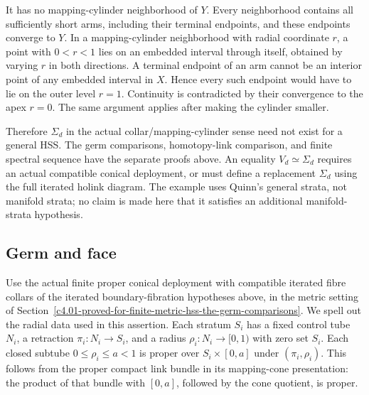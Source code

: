 \documentclass[11pt,a4paper]{article}
\theoremstyle{definition}
\begin{document}
It has no mapping-cylinder neighborhood of \(Y\). Every neighborhood contains all sufficiently short arms, including their terminal endpoints, and these endpoints converge to \(Y\). In a mapping-cylinder neighborhood with radial coordinate \(r\), a point with \(0<r<1\) lies on an embedded interval through itself, obtained by varying \(r\) in both directions. A terminal endpoint of an arm cannot be an interior point of any embedded interval in \(X\). Hence every such endpoint would have to lie on the outer level \(r=1\). Continuity is contradicted by their convergence to the apex \(r=0\). The same argument applies after making the cylinder smaller.

Therefore \(\Sigma_d\) in the actual collar/mapping-cylinder sense need not exist for a general HSS. The germ comparisons, homotopy-link comparison, and finite spectral sequence have the separate proofs above. An equality \(V_d\simeq\Sigma_d\) requires an actual compatible conical deployment, or must define a replacement \(\Sigma_d\) using the full iterated holink diagram. The example uses Quinn's general strata, not manifold strata; no claim is made here that it satisfies an additional manifold-strata hypothesis.

\subsection{Germ and face}\label{c4.05-proved-with-proper-controlled-collars-germ-and-face}

Use the actual finite proper conical deployment with compatible iterated fibre collars of the iterated boundary-fibration hypotheses above, in the metric setting of Section~\ref{c4.01-proved-for-finite-metric-hss-the-germ-comparisons}. We spell out the radial data used in this assertion. Each stratum \(S_i\) has a fixed control tube \(N_i\), a retraction \(\pi_i:N_i\to S_i\), and a radius \(\rho_i:N_i\to[0,1)\) with zero set \(S_i\). Each closed subtube \(0\le\rho_i\le a<1\) is proper over \(S_i\times[0,a]\) under \((\pi_i,\rho_i)\). This follows from the proper compact link bundle in its mapping-cone presentation: the product of that bundle with \([0,a]\), followed by the cone quotient, is proper.
\end{document}
